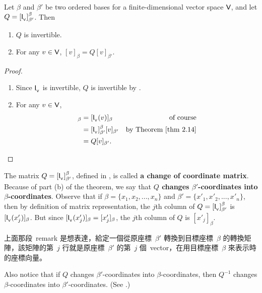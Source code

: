 \begin{theorem} \label{thm 2.22}
Let \(\beta\) and \(\beta'\) be two ordered bases for a finite-dimensional vector space \(\textsf{V}\), and let \(Q = [\textsf{I}_{_{\textsf{V}}}]_{\beta'}^{\beta}\).
Then
\begin{enumerate}
\item \(Q\) is invertible.
\item For any \(v \in \textsf{V}\), \([v]_{\beta} = Q[v]_{\beta'}\).
\end{enumerate}
\end{theorem}

\begin{proof} \ 

\begin{enumerate}
\item Since \(\textsf{I}_{_{\textsf{V}}}\) is invertible, \(Q\) is invertible by .

\item For any \(v \in \textsf{V}\),
\begin{align*}
    [v]_{\beta} & = [\ITRANV(v)]_{\beta} & \text{of course} \\
                & = [\ITRANV]_{\beta'}^{\beta} [v]_{\beta'} & \text{by \THM{2.14}} \\
                & = Q [v]_{\beta'}.
\end{align*}
\end{enumerate}
\end{proof}

\begin{remark} \label{remark 2.5.1}
The matrix \(Q = [\textsf{I}_{_{\textsf{V}}}]_{\beta'}^{\beta}\), defined in , is called \textbf{a change of coordinate matrix}.
Because of part (b) of the theorem, we say that \textbf{\(Q\) changes \(\beta'\)-coordinates into \(\beta\)-coordinates}.
Observe that if \(\beta = \{ x_1, x_2, ..., x_n \}\) and \(\beta' = \{ x'_1, x'_2, ..., x'_n \}\), then by definition of matrix representation, the \(j\)th column of \(Q = [\textsf{I}_{_{\textsf{V}}}]_{\beta'}^{\beta}\) is \([\textsf{I}_{_{\textsf{V}}}(x'_j)]_{\beta}\).
But since \([\textsf{I}_{_{\textsf{V}}}(x'_j)]_{\beta} = [x'_j]_{\beta}\), the \(j\)th column of \(Q\) is \([x'_j]_{\beta}\).
\end{remark}

\begin{note}
上面那段\ remark 是想表達，給定一個從原座標\ \(\beta'\) 轉換到目標座標\ \(\beta\) 的轉換矩陣，該矩陣的第\ \(j\) 行就是原座標\ \(\beta'\) 的第\ \(j\) 個\ vector，在用目標座標\ \(\beta\) 來表示時的座標向量。
\end{note}

Also notice that if \(Q\) changes \(\beta'\)-coordinates into \(\beta\)-coordinates, then \(Q^{-1}\) changes \(\beta\)-coordinates into \(\beta'\)-coordinates. (See .)

